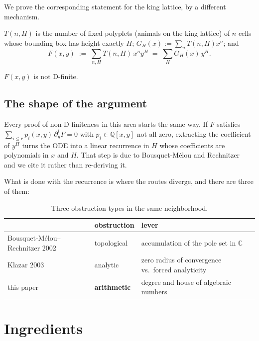 \documentclass[11pt]{article}
\newcommand{\Q}{\mathbb{Q}}
\newcommand{\C}{\mathbb{C}}
\begin{document}
We prove the corresponding statement for the king lattice, by a different
mechanism.

\begin{definition}
$T(n,H)$ is the number of fixed polyplets (animals on the king lattice)
of $n$ cells whose
bounding box has height exactly $H$; $G_H(x) := \sum_n T(n,H)x^n$; and
\[
  F(x,y) \;:=\; \sum_{n,H} T(n,H)\,x^n y^H \;=\; \sum_H G_H(x)\,y^H .
\]
\end{definition}

\begin{theorem}
\label{thm:main}
$F(x,y)$ is not D-finite.
\end{theorem}

\subsection{The shape of the argument}

Every proof of non-D-finiteness in this area starts the same way. If $F$ satisfies
$\sum_{i \le r}p_i(x,y)\,\partial_y^i F = 0$ with $p_i \in \Q[x,y]$ not all zero,
extracting the coefficient of $y^H$ turns the ODE into a linear recurrence in $H$
whose coefficients are polynomials in $x$ and $H$. That step is due to
Bousquet-M\'elou and Rechnitzer~\cite[Lemma~9]{bmr2002} and we cite it rather than re-deriving it.

What is done with the recurrence is where the routes diverge, and there are three
of them:

\begin{table}[H]
\centering\small
\begin{tabular}{l l l}
\toprule
 & obstruction & lever \\
\midrule
Bousquet-M\'elou--Rechnitzer 2002~\cite{bmr2002} & topological & accumulation of the pole set in $\C$ \\
Klazar 2003~\cite{klazar2003} & analytic & zero radius of convergence vs.\ forced analyticity \\
this paper & \textbf{arithmetic} & degree and house of algebraic numbers \\
\bottomrule
\end{tabular}
\caption{Three obstruction types in the same neighborhood.}
\label{tab:three}
\end{table}

\section{Ingredients}
\end{document}
